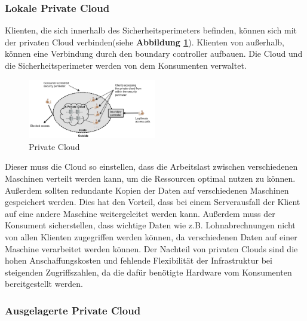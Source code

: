\subsubsection{Lokale Private Cloud}
Klienten, die sich innerhalb des Sicherheitsperimeters befinden, können sich mit der privaten Cloud verbinden(siehe \textbf{Abbildung \ref{PrivateCloud}}). 
Klienten von außerhalb, können eine Verbindung durch den \glqq boundary controller\grqq{} aufbauen. Die Cloud und die Sicherheitsperimeter werden von dem Konsumenten verwaltet.
\begin{figure}[h]
    \centering
	\includegraphics[width=0.5\textwidth]{Images/On-sitePrivateCloud}
	\caption{Private Cloud \cite{Badger}}
	\label{PrivateCloud}
\end{figure}
Dieser muss die Cloud so einstellen, dass die Arbeitslast zwischen verschiedenen Maschinen verteilt werden kann, um die Ressourcen optimal nutzen zu können. Außerdem sollten redundante Kopien der Daten auf verschiedenen Maschinen 
gespeichert werden. Dies hat den Vorteil, dass bei einem Serverausfall der Klient auf eine andere Maschine weitergeleitet werden kann.
Außerdem muss der Konsument sicherstellen, dass wichtige Daten wie z.B. Lohnabrechnungen nicht von allen Klienten zugegriffen werden können,
da verschiedenen Daten auf einer Maschine verarbeitet werden können. Der Nachteil von privaten Clouds sind die hohen Anschaffungskosten und fehlende Flexibilität der Infrastruktur bei steigenden Zugriffszahlen, da die dafür benötigte Hardware vom Konsumenten bereitgestellt werden\cite{Badger}.

\subsubsection{Ausgelagerte Private Cloud}

